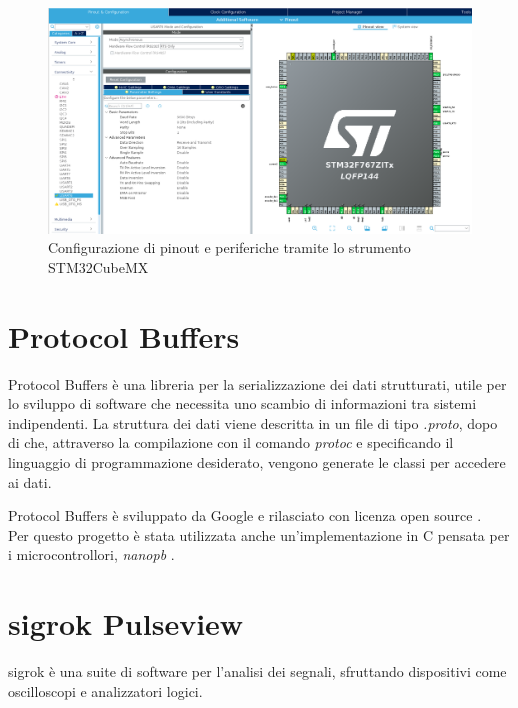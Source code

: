 \begin{figure}[H]
\centering
\includegraphics[width=\textwidth]{images/stm32cubemx.png}
\caption{Configurazione di pinout e periferiche tramite lo strumento STM32CubeMX}
\end{figure}

\section{Protocol Buffers}
Protocol Buffers è una libreria per la serializzazione dei dati strutturati, utile per lo sviluppo di software che necessita uno scambio di informazioni tra sistemi indipendenti.
La struttura dei dati viene descritta in un file di tipo \textit{.proto}, dopo di che, attraverso la compilazione con il comando \textit{protoc} e specificando il linguaggio di programmazione desiderato, vengono generate le classi per accedere ai dati. 
                
Protocol Buffers è sviluppato da Google e rilasciato con licenza open source \cite{ProtocolBuffers}. \\
Per questo progetto è stata utilizzata anche un'implementazione in C pensata per i microcontrollori, \textit{nanopb} \cite{nanopb}.

\newpage




\section{sigrok Pulseview}
sigrok è una suite di software per l'analisi dei segnali, sfruttando dispositivi come oscilloscopi e analizzatori logici. 


